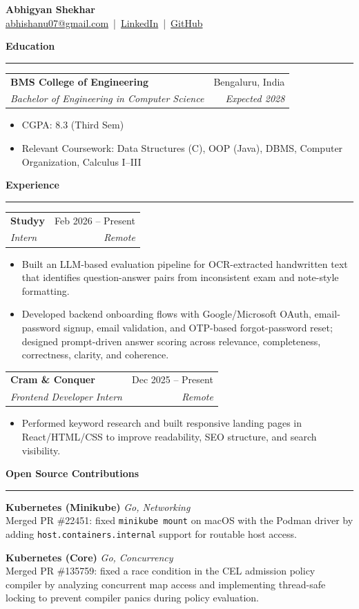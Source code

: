 \documentclass[10pt,letterpaper]{article}
\newenvironment{tightitemize}{
  \begin{itemize}
    \setlength{\itemsep}{1pt}
    \setlength{\topsep}{2pt}
    \setlength{\parsep}{0pt}
    \setlength{\partopsep}{0pt}
    \setlength{\parskip}{0pt}
  }{
  \end{itemize}
}
\newcommand{\resumeSubheading}[4]{
  \begin{tabularx}{\textwidth}{Xr}
    \textbf{#1} & #2 \\
    \textit{#3} & \textit{#4} \\
  \end{tabularx}
}
\newcommand{\resumeProject}[3]{
  \textbf{#1} \hfill \textit{#2}\\
  #3
}
\newcommand{\resumeSection}[1]{
  \vspace{4pt}
  {\large\bfseries #1}\\[-2pt]
  \hrule
  \vspace{1pt}
}
\begin{document}
\small

\begin{center}
    {\LARGE \textbf{Abhigyan Shekhar}}\\[4pt]
    \href{mailto:abhishanu07@gmail.com}{abhishanu07@gmail.com} \,|\, \href{https://www.linkedin.com/in/abhigyan-shekhar-4b3b8b344/}{LinkedIn} \,|\, \href{https://github.com/Abhigyan-Shekhar}{GitHub}
\end{center}

\resumeSection{Education}
\resumeSubheading
  {BMS College of Engineering}{Bengaluru, India}
  {Bachelor of Engineering in Computer Science}{Expected 2028}
\begin{tightitemize}
  \item CGPA: 8.3 (Third Sem)
  \item Relevant Coursework: Data Structures (C), OOP (Java), DBMS, Computer Organization, Calculus I--III
\end{tightitemize}

\resumeSection{Experience}
\resumeSubheading
  {Studyy}{Feb 2026 -- Present}
  {Intern}{Remote}
\begin{tightitemize}
  \item Built an LLM-based evaluation pipeline for OCR-extracted handwritten text that identifies question-answer pairs from inconsistent exam and note-style formatting.
  \item Developed backend onboarding flows with Google/Microsoft OAuth, email-password signup, email validation, and OTP-based forgot-password reset; designed prompt-driven answer scoring across relevance, completeness, correctness, clarity, and coherence.
\end{tightitemize}

\resumeSubheading
  {Cram \& Conquer}{Dec 2025 -- Present}
  {Frontend Developer Intern}{Remote}
\begin{tightitemize}
  \item Performed keyword research and built responsive landing pages in React/HTML/CSS to improve readability, SEO structure, and search visibility.
\end{tightitemize}

\resumeSection{Open Source Contributions}
\resumeProject
  {Kubernetes (Minikube)}{Go, Networking}
  {Merged PR \#22451: fixed \texttt{minikube mount} on macOS with the Podman driver by adding \texttt{host.containers.internal} support for routable host access.}

\resumeProject
  {Kubernetes (Core)}{Go, Concurrency}
  {Merged PR \#135759: fixed a race condition in the CEL admission policy compiler by analyzing concurrent map access and implementing thread-safe locking to prevent compiler panics during policy evaluation.}
\end{document}
